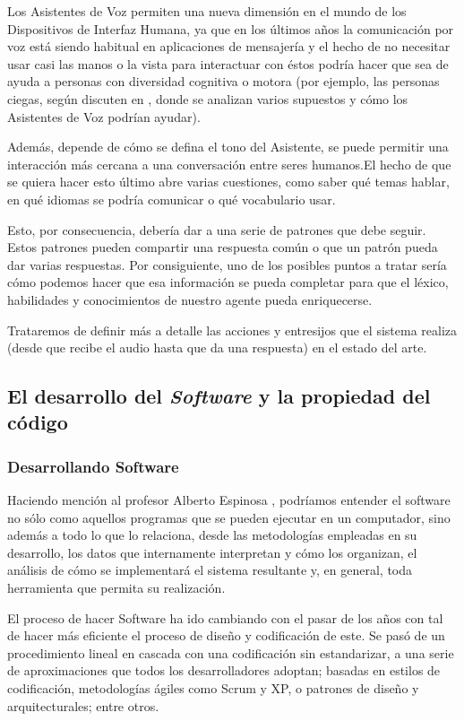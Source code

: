 Los Asistentes de Voz permiten una nueva dimensión en el mundo de los Dispositivos de Interfaz Humana, ya que en los últimos años la comunicación por voz está siendo habitual en aplicaciones de mensajería y el hecho de no necesitar usar casi las manos o la vista para interactuar con éstos podría hacer que sea de ayuda a personas con diversidad cognitiva o motora (por ejemplo, las personas ciegas, según discuten en  \cite{va-benefits}, donde se analizan varios supuestos y cómo los Asistentes de Voz podrían ayudar).

Además, depende de cómo se defina el tono del Asistente, se puede permitir una interacción más cercana a una conversación entre seres humanos.El hecho de que se quiera hacer esto último abre varias cuestiones, como saber qué temas hablar, en qué idiomas se podría comunicar o qué vocabulario usar.

Esto, por consecuencia, debería dar a una serie de patrones que debe seguir. Estos patrones pueden compartir una respuesta común o que un patrón pueda dar varias respuestas. Por consiguiente, uno de los posibles puntos a tratar sería cómo podemos hacer que esa información se pueda completar para que el léxico, habilidades y conocimientos de nuestro agente pueda enriquecerse.

Trataremos de definir más a detalle las acciones y entresijos que el sistema realiza (desde que recibe el audio hasta que da una respuesta) en el estado del arte.

\subsection{El desarrollo del \textit{Software} y la propiedad del código }
\subsubsection{Desarrollando Software}
Haciendo mención al profesor Alberto Espinosa \cite{Prieto2006-ss}, podríamos entender el software no sólo como aquellos programas que se pueden ejecutar en un computador, sino además a todo lo que lo relaciona, desde las metodologías empleadas en su desarrollo, los datos que internamente interpretan y cómo los organizan, el análisis de cómo se implementará el sistema resultante y, en general, toda herramienta que permita su realización. 

El proceso de hacer Software ha ido cambiando con el pasar de los años con tal de hacer más eficiente el proceso de diseño y codificación de este. Se pasó de un procedimiento lineal en cascada con una codificación sin estandarizar, a una serie de aproximaciones que todos los desarrolladores adoptan; basadas en estilos de codificación, metodologías ágiles como Scrum y XP, o patrones de diseño y arquitecturales; entre otros. 

